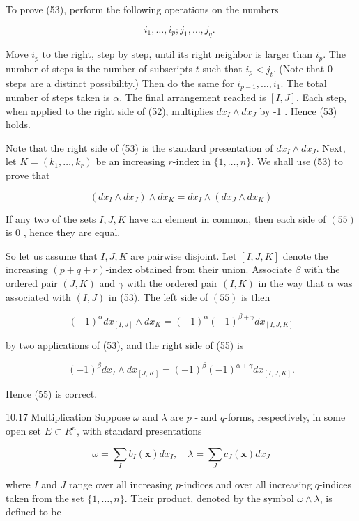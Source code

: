\documentclass[10pt]{article}
\begin{document}
To prove (53), perform the following operations on the numbers

$$
i_{1}, \ldots, i_{p} ; j_{1}, \ldots, j_{q} \text {. }
$$

Move $i_{p}$ to the right, step by step, until its right neighbor is larger than $i_{p}$. The number of steps is the number of subscripts $t$ such that $i_{p}<j_{t}$. (Note that 0 steps are a distinct possibility.) Then do the same for $i_{p-1}, \ldots, i_{1}$. The total number of steps taken is $\alpha$. The final arrangement reached is $[I, J]$. Each step, when applied to the right side of (52), multiplies $d x_{I} \wedge d x_{J}$ by -1 . Hence (53) holds.

Note that the right side of (53) is the standard presentation of $d x_{I} \wedge d x_{J}$. Next, let $K=\left(k_{1}, \ldots, k_{r}\right)$ be an increasing $r$-index in $\{1, \ldots, n\}$. We shall use (53) to prove that

$$
\left(d x_{I} \wedge d x_{J}\right) \wedge d x_{K}=d x_{I} \wedge\left(d x_{J} \wedge d x_{K}\right)
$$

If any two of the sets $I, J, K$ have an element in common, then each side of $(55)$ is 0 , hence they are equal.

So let us assume that $I, J, K$ are pairwise disjoint. Let $[I, J, K]$ denote the increasing $(p+q+r)$-index obtained from their union. Associate $\beta$ with the ordered pair $(J, K)$ and $\gamma$ with the ordered pair $(I, K)$ in the way that $\alpha$ was associated with $(I, J)$ in (53). The left side of $(55)$ is then

$$
(-1)^{\alpha} d x_{[I, J]} \wedge d x_{K}=(-1)^{\alpha}(-1)^{\beta+\gamma} d x_{[I, J, K]}
$$

by two applications of (53), and the right side of (55) is

$$
(-1)^{\beta} d x_{I} \wedge d x_{[J, K]}=(-1)^{\beta}(-1)^{\alpha+\gamma} d x_{[I, J, K]} .
$$

Hence (55) is correct.

10.17 Multiplication Suppose $\omega$ and $\lambda$ are $p$ - and $q$-forms, respectively, in some open set $E \subset R^{n}$, with standard presentations

$$
\omega=\sum_{I} b_{I}(\mathbf{x}) d x_{I}, \quad \lambda=\sum_{J} c_{J}(\mathbf{x}) d x_{J}
$$

where $I$ and $J$ range over all increasing $p$-indices and over all increasing $q$-indices taken from the set $\{1, \ldots, n\}$. Their product, denoted by the symbol $\omega \wedge \lambda$, is defined to be
\end{document}
